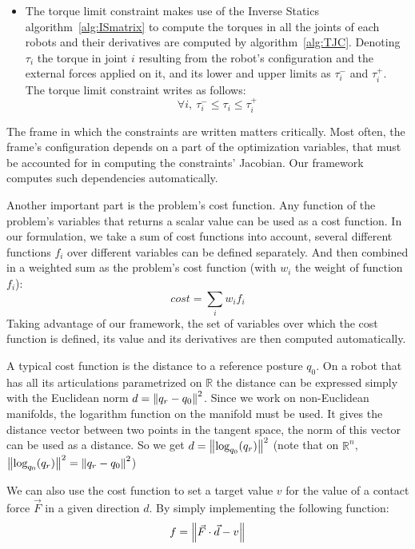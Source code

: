 \begin{itemize}
\item The torque limit constraint makes use of the Inverse Statics algorithm~\ref{alg:ISmatrix} to compute the torques in all the joints of each robots and their derivatives are computed by algorithm~\ref{alg:TJC}.
Denoting $\tau_i$ the torque in joint $i$ resulting from the robot's configuration and the external forces applied on it, and its lower and upper limits as $\tau_i^-$ and $\tau_i^+$. The torque limit constraint writes as follows:
\begin{equation}
  \forall i,\ \tau_i^- \leq \tau_i \leq \tau_i^+
\end{equation}
\end{itemize}


The frame in which the constraints are written matters critically.
Most often, the frame's configuration depends on a part of the optimization variables, that must be accounted for in computing the constraints' Jacobian.
Our framework computes such dependencies automatically.

Another important part is the problem's cost function.
Any function of the problem's variables that returns a scalar value can be used as a cost function.
In our formulation, we take a sum of cost functions into account, several different functions $f_i$ over different variables can be defined separately.
And then combined in a weighted sum as the problem's cost function (with $w_i$ the weight of function $f_i$):
\begin{equation}
  cost = \sum\limits_i w_i f_i
\end{equation}
Taking advantage of our framework, the set of variables over which the cost function is defined, its value and its derivatives are then computed automatically.

A typical cost function is the distance to a reference posture $q_0$.
On a robot that has all its articulations parametrized on $\mathbb{R}$ the distance can be expressed simply with the Euclidean norm $d = \left\| q_r-q_0 \right\|^2$.
Since we work on non-Euclidean manifolds, the logarithm function on the manifold must be used.
It gives the distance vector between two points in the tangent space, the norm of this vector can be used as a distance.
So we get $d = \left\| \text{log}_{q_0}(q_r) \right\|^2$ (note that on $\mathbb{R}^n$, $\left\| \text{log}_{q_0}(q_r) \right\|^2 = \left\| q_r - q_0 \right\|^2$)

We can also use the cost function to set a target value $v$ for the value of a contact force $\vec{F}$ in a given direction $d$. By simply implementing the following function:
\begin{equation}
  f = \left\| \vec{F}\cdot\vec{d}-v \right\|
\end{equation}

